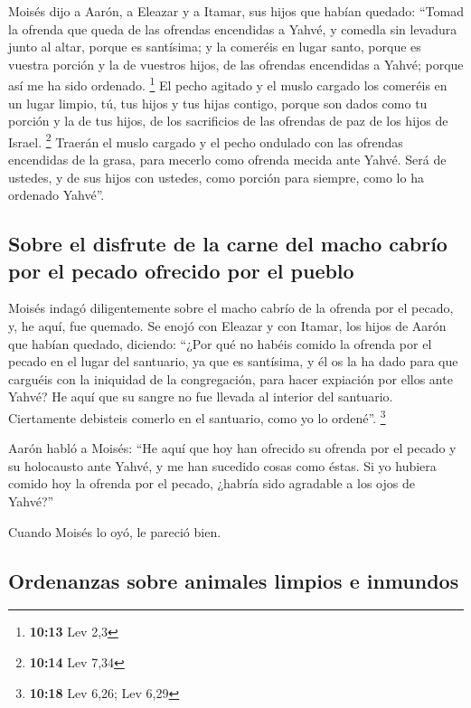  Moisés dijo a Aarón, a Eleazar y a Itamar, sus hijos que
habían quedado: ``Tomad la ofrenda que queda de las ofrendas encendidas
a Yahvé, y comedla sin levadura junto al altar, porque es santísima;
 y la comeréis en lugar santo, porque es vuestra porción
y la de vuestros hijos, de las ofrendas encendidas a Yahvé; porque así
me ha sido ordenado. \footnote{\textbf{10:13} Lev 2,3} 
El pecho agitado y el muslo cargado los comeréis en un lugar limpio, tú,
tus hijos y tus hijas contigo, porque son dados como tu porción y la de
tus hijos, de los sacrificios de las ofrendas de paz de los hijos de
Israel. \footnote{\textbf{10:14} Lev 7,34}  Traerán el
muslo cargado y el pecho ondulado con las ofrendas encendidas de la
grasa, para mecerlo como ofrenda mecida ante Yahvé. Será de ustedes, y
de sus hijos con ustedes, como porción para siempre, como lo ha ordenado
Yahvé''.

\hypertarget{sobre-el-disfrute-de-la-carne-del-macho-cabruxedo-por-el-pecado-ofrecido-por-el-pueblo}{%
\subsection{Sobre el disfrute de la carne del macho cabrío por el pecado
ofrecido por el
pueblo}\label{sobre-el-disfrute-de-la-carne-del-macho-cabruxedo-por-el-pecado-ofrecido-por-el-pueblo}}

 Moisés indagó diligentemente sobre el macho cabrío de la
ofrenda por el pecado, y, he aquí, fue quemado. Se enojó con Eleazar y
con Itamar, los hijos de Aarón que habían quedado, diciendo:
 ``¿Por qué no habéis comido la ofrenda por el pecado en
el lugar del santuario, ya que es santísima, y él os la ha dado para que
carguéis con la iniquidad de la congregación, para hacer expiación por
ellos ante Yahvé?  He aquí que su sangre no fue llevada
al interior del santuario. Ciertamente debisteis comerlo en el
santuario, como yo lo ordené''. \footnote{\textbf{10:18} Lev 6,26; Lev
  6,29}

 Aarón habló a Moisés: ``He aquí que hoy han ofrecido su
ofrenda por el pecado y su holocausto ante Yahvé, y me han sucedido
cosas como éstas. Si yo hubiera comido hoy la ofrenda por el pecado,
¿habría sido agradable a los ojos de Yahvé?''

 Cuando Moisés lo oyó, le pareció bien.

\hypertarget{ordenanzas-sobre-animales-limpios-e-inmundos}{%
\subsection{Ordenanzas sobre animales limpios e
inmundos}\label{ordenanzas-sobre-animales-limpios-e-inmundos}}

